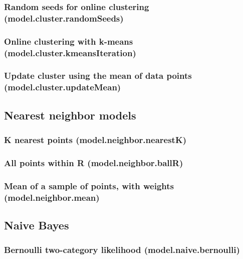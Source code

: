 \documentclass{article}
\theoremstyle{definition}
\begin{document}
\subsubsection{Random seeds for online clustering (model.cluster.randomSeeds)}

\subsubsection{Online clustering with k-means (model.cluster.kmeansIteration)}

\subsubsection{Update cluster using the mean of data points (model.cluster.updateMean)}

\subsection{Nearest neighbor models}

\subsubsection{K nearest points (model.neighbor.nearestK)}

\subsubsection{All points within R (model.neighbor.ballR)}

\subsubsection{Mean of a sample of points, with weights (model.neighbor.mean)}

\subsection{Naive Bayes}

\subsubsection{Bernoulli two-category likelihood (model.naive.bernoulli)}
\end{document}
